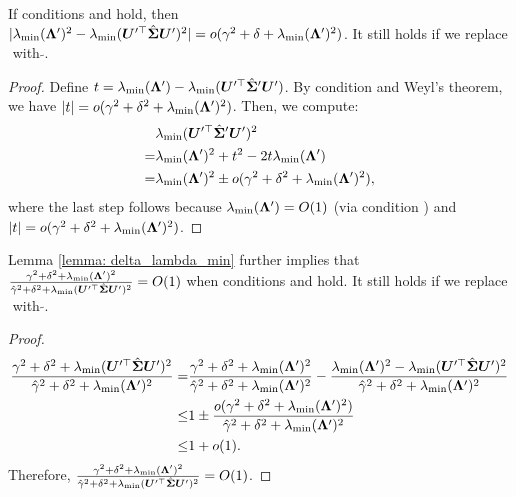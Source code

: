 \begin{lemma}\label{lemma: delta_lambda_min}
If conditions \bounded{} and \conc{} hold, then $|\lambda_{\min}({\bm{\Lambda}}')^2 -\lambda_{\min}({\bm{U}}'^\top \hat{{\bm{\Sigma}}}{\bm{U}}')^2| = o(\gamma^2+\delta+\lambda_{\min}({\bm{\Lambda}}')^2) $. It still holds if we replace $\hat{}$ with $\tilde{}$.
\end{lemma}
\begin{proof}
Define $t= \lambda_{\min}({\bm{\Lambda}}')-\lambda_{\min}({\bm{U}}'^\top\hat{{\bm{\Sigma}}}'{\bm{U}}')$.
 By condition \conc{} and Weyl's theorem, we have $|t| = o( \gamma^2+\delta^2+\lambda_{\min}({\bm{\Lambda}}')^2 )$. Then, we compute:
\begin{align}
    \nonumber
    &\lambda_{\min}({\bm{U}}'^\top\hat{{\bm{\Sigma}}}'{\bm{U}}')^2 \\
    \nonumber
    = & \lambda_{\min}({\bm{\Lambda}}')^2 + t^2 - 2t\lambda_{\min}({\bm{\Lambda}}')\\
    \nonumber
    = & \lambda_{\min}({\bm{\Lambda}}')^2 \pm o(\gamma^2+\delta^2+\lambda_{\min}({\bm{\Lambda}}')^2 ),
\end{align}
where the last step follows because $\lambda_{\min}({\bm{\Lambda}}')=O(1)$ (via condition \bounded{}) and $|t|=o( \gamma^2+\delta^2+\lambda_{\min}({\bm{\Lambda}}')^2 )$.
\end{proof}

\begin{corollary}\label{coro: ratio_lambda_min}
Lemma \ref{lemma: delta_lambda_min} further implies that $ \frac{\gamma^2+\delta^2+\lambda_{\min}({\bm{\Lambda}}')^2}{\hat{\gamma}^2+\delta^2+\lambda_{\min}({\bm{U}}'^\top \hat{{\bm{\Sigma}}}{\bm{U}}'  )^2}=O(1) $ when conditions \bounded{} and \conc{} hold. It still holds if we replace $\hat{}$ with $\tilde{}$. 
\end{corollary}
\begin{proof}
\begin{align}
    \nonumber
\frac{\gamma^2+\delta^2+\lambda_{\min}({\bm{U}}'^\top \hat{{\bm{\Sigma}}}{\bm{U}}'  )^2}{\hat{\gamma}^2+\delta^2+\lambda_{\min}({\bm{\Lambda}}')^2} = & \frac{\gamma^2+\delta^2+\lambda_{\min}({\bm{\Lambda}}')^2}{\hat{\gamma}^2+\delta^2+\lambda_{\min}({\bm{\Lambda}}')^2} - \frac{\lambda_{\min}({\bm{\Lambda}}')^2 - \lambda_{\min}({\bm{U}}'^\top \hat{{\bm{\Sigma}}}{\bm{U}}'  )^2 }{\hat{\gamma}^2+\delta^2+\lambda_{\min}({\bm{\Lambda}}')^2} \\
    \nonumber
    \leq & 1\pm \frac{ o(\gamma^2+\delta^2+\lambda_{\min}({\bm{\Lambda}}')^2 ) }{\hat{\gamma}^2+\delta^2+\lambda_{\min}({\bm{\Lambda}}')^2}\\
    \nonumber
    \leq & 1+ o(1).
\end{align}   
Therefore, $ \frac{\gamma^2+\delta^2+\lambda_{\min}({\bm{\Lambda}}')^2}{\hat{\gamma}^2+\delta^2+\lambda_{\min}({\bm{U}}'^\top \hat{{\bm{\Sigma}}}{\bm{U}}'  )^2}=O(1) $. 
\end{proof}

